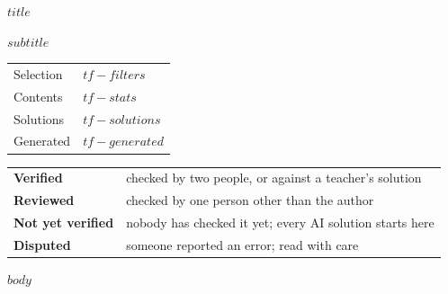 \documentclass[10pt,a4paper]{article}
\begin{document}
\thispagestyle{empty}
\begin{center}
{\LARGE\bfseries $title$\par}
\vspace{3pt}
{\large $subtitle$\par}
\end{center}
\vspace{6pt}
\begin{tcolorbox}[colback=black!3,colframe=black!15,boxrule=0.4pt,arc=1mm,left=6pt,right=6pt]
\small
\begin{tabularx}{\linewidth}{@{}l>{\raggedright\arraybackslash}X@{}}
Selection & $tf-filters$ \\
Contents & $tf-stats$ \\
Solutions & $tf-solutions$ \\
Generated & $tf-generated$ \\
\end{tabularx}
\end{tcolorbox}
{\footnotesize
\begin{tabularx}{\linewidth}{@{}l>{\raggedright\arraybackslash}X@{}}
\textcolor{tfverified}{\textbf{Verified}} & checked by two people, or against a teacher's solution \\
\textcolor{tfreviewed}{\textbf{Reviewed}} & checked by one person other than the author \\
\textcolor{tfunverified}{\textbf{Not yet verified}} & nobody has checked it yet; every AI solution starts here \\
\textcolor{tfdisputed}{\textbf{Disputed}} & someone reported an error; read with care \\
\end{tabularx}\par}
\medskip
\renewcommand{\contentsname}{$tf-contents$}\setcounter{tocdepth}{3}
{\small\tableofcontents}
\clearpage
$body$
\end{document}
